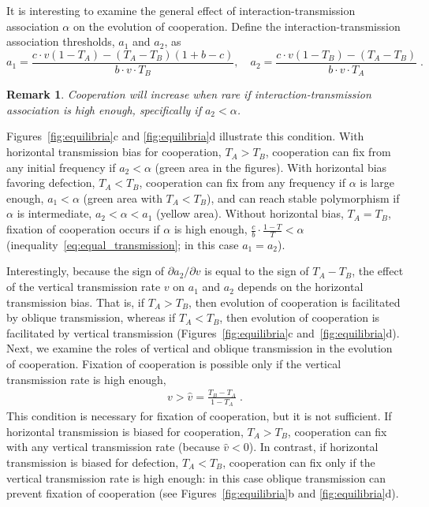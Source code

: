 \documentclass[12pt]{extarticle}
\newtheorem{remark}{Remark}
\begin{document}
It is interesting to examine the general effect of interaction-transmission association $\alpha$ on the evolution of cooperation.
Define the interaction-transmission association thresholds, $a_1$ and $a_2$, as 
\begin{equation} \label{eq:boundries_assortative_meeting_general_case}
  a_1 = \frac{c\cdot v(1-T_A) -(T_A-T_B)(1+b-c)}{b\cdot v \cdot T_B}, \quad
  a_2 = \frac{c\cdot v(1-T_B)-(T_A-T_B)}{b\cdot v\cdot T_A} \;.
\end{equation}

\begin{remark}%
\label{remark:intermediate_association_res3}
Cooperation will increase when rare if interaction-transmission association is high enough, specifically if $a_2 < \alpha$.
\end{remark}
Figures~\ref{fig:equilibria}c and \ref{fig:equilibria}d illustrate this condition.
With horizontal transmission bias for cooperation, $T_A>T_B$, cooperation can fix from any initial frequency if $a_2<\alpha$ (green area in the figures). 
With horizontal bias favoring defection, $T_A<T_B$, cooperation can fix from any frequency if $\alpha$ is large enough, $a_1<\alpha$ (green area with $T_A<T_B$), and can reach stable polymorphism if $\alpha$ is intermediate, $a_2<\alpha<a_1$ (yellow area).
Without horizontal bias, $T_A=T_B$, fixation of cooperation occurs if $\alpha$ is high enough, $\frac{c}{b} \cdot \frac{1-T}{T} < \alpha$ (inequality~\ref{eq:equal_transmission}; in this case $a_1=a_2$).

Interestingly, because the sign of $\partial a_2 / \partial v$  is equal to the sign of $T_A-T_B$, the effect of the vertical transmission rate $v$ on $a_1$ and $a_2$ depends on the horizontal transmission bias. 
That is, if $T_A>T_B$, then evolution of cooperation is facilitated by oblique transmission, whereas if $T_A<T_B$, then evolution of cooperation is facilitated by vertical transmission (Figures~\ref{fig:equilibria}c and~\ref{fig:equilibria}d).
\\

Next, we examine the roles of vertical and oblique transmission in the evolution of cooperation.
Fixation of cooperation is possible only if the vertical transmission rate is high enough,
  \begin{equation} \label{eq:fixation_of_cooperation_vertical_transmission_condition}
    \begin{aligned}
      v>\hat{v} = \frac{T_B - T_A}{1-T_A} \;.
    \end{aligned}
    \end{equation} 
This condition is necessary for fixation of cooperation, but it is not sufficient.
If horizontal transmission is biased for cooperation, $T_A>T_B$, cooperation can fix with any vertical transmission rate (because $\hat{v}<0$).
In contrast, if horizontal transmission is biased for defection, $T_A<T_B$,  cooperation can fix only if the vertical transmission rate is high enough: in this case oblique transmission can prevent fixation of cooperation (see Figures~\ref{fig:equilibria}b and \ref{fig:equilibria}d).
\end{document}
